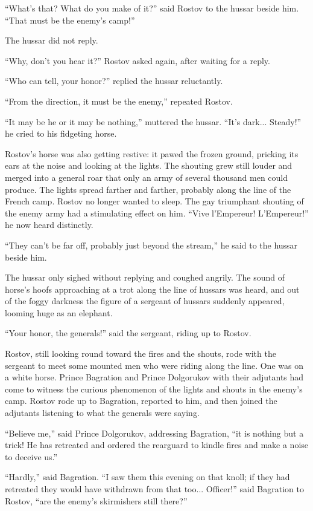 ``What's that? What do you make of it?'' said Rostov to the
hussar beside him. ``That must be the enemy's camp!''

The hussar did not reply.

``Why, don't you hear it?'' Rostov asked again, after waiting for
a reply.

``Who can tell, your honor?'' replied the hussar reluctantly.

``From the direction, it must be the enemy,'' repeated Rostov.

``It may be he or it may be nothing,'' muttered the
hussar. ``It's dark...  Steady!'' he cried to his fidgeting
horse.

Rostov's horse was also getting restive: it pawed the frozen
ground, pricking its ears at the noise and looking at the
lights. The shouting grew still louder and merged into a general
roar that only an army of several thousand men could produce. The
lights spread farther and farther, probably along the line of the
French camp. Rostov no longer wanted to sleep. The gay triumphant
shouting of the enemy army had a stimulating effect on
him. ``Vive l'Empereur! L'Empereur!'' he now heard distinctly.

``They can't be far off, probably just beyond the stream,'' he
said to the hussar beside him.

The hussar only sighed without replying and coughed angrily. The
sound of horse's hoofs approaching at a trot along the line of
hussars was heard, and out of the foggy darkness the figure of a
sergeant of hussars suddenly appeared, looming huge as an
elephant.

``Your honor, the generals!'' said the sergeant, riding up to
Rostov.

Rostov, still looking round toward the fires and the shouts, rode
with the sergeant to meet some mounted men who were riding along
the line.  One was on a white horse. Prince Bagration and Prince
Dolgorukov with their adjutants had come to witness the curious
phenomenon of the lights and shouts in the enemy's camp. Rostov
rode up to Bagration, reported to him, and then joined the
adjutants listening to what the generals were saying.

``Believe me,'' said Prince Dolgorukov, addressing Bagration,
``it is nothing but a trick! He has retreated and ordered the
rearguard to kindle fires and make a noise to deceive us.''

``Hardly,'' said Bagration. ``I saw them this evening on that
knoll; if they had retreated they would have withdrawn from that
too... Officer!''  said Bagration to Rostov, ``are the enemy's
skirmishers still there?''

